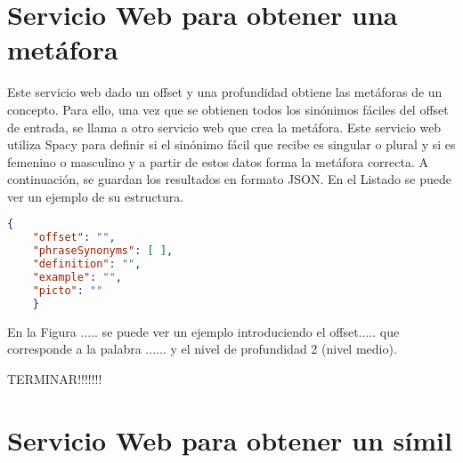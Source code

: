 \section{Servicio Web  para obtener una metáfora}
Este servicio web dado un offset y una profundidad obtiene las metáforas de un concepto.
Para ello, una vez que se obtienen todos los sinónimos fáciles del offset de entrada, se llama a otro servicio web que crea la metáfora. Este servicio web utiliza Spacy para definir si el sinónimo fácil que recibe es singular o plural y si es femenino o masculino y a partir de estos datos forma la metáfora correcta.
A continuación, se guardan los resultados en formato JSON. En el Listado   se puede ver un ejemplo de su estructura.





\begin{lstlisting}[language=json, caption= Estructura JSON para las metáforas, label={lst:JSONhiponimofacil}, frame=single]
	{ 
	"offset": "", 
	"phraseSynonyms": [ ], 
	"definition": "", 
	"example": "", 
	"picto": ""
	}
\end{lstlisting}

En la Figura ..... se puede ver un ejemplo introduciendo el offset..... que corresponde a la palabra ...... y el nivel de profundidad 2 (nivel medio).



TERMINAR!!!!!!!
\section{Servicio Web  para obtener un símil}



